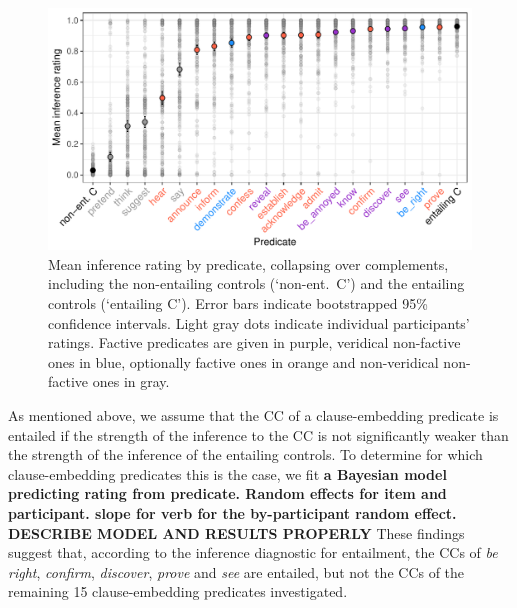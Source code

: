 \documentclass[11pt,fleqn]{article}
\newcommand{\6}{\mbox{$[\hspace*{-.6mm}[$}}
\newcommand{\9}{\mbox{$]\hspace*{-.6mm}]$}}
\begin{document}
\begin{figure}[h!]
\centering

\includegraphics[width=.7\paperwidth]{../results/4-veridicality3/graphs/means-inference-by-predicate-variability}

\caption{Mean inference rating by predicate, collapsing over complements, including the non-entailing controls (`non-ent.\ C') and the entailing controls (`entailing C'). Error bars indicate bootstrapped 95\% confidence intervals. Light gray dots indicate individual participants' ratings. Factive predicates are given in purple, veridical non-factive ones in blue, optionally factive ones in orange and non-veridical non-factive ones in gray.}
\label{f-veridicality-predicate2}
\end{figure}

As mentioned above, we assume that the CC of a clause-embedding predicate is entailed if the strength of the inference to the CC is not significantly weaker than the strength of the inference of the entailing controls. To determine for which clause-embedding predicates this is the case, we fit {\bf a Bayesian model predicting rating from predicate. Random effects for item and participant. slope for verb for the by-participant random effect. DESCRIBE MODEL AND RESULTS PROPERLY}  These findings suggest that, according to the inference diagnostic for entailment, the CCs of {\em be right}, {\em confirm}, {\em discover}, {\em prove} and {\em see} are entailed, but not the CCs of the remaining 15 clause-embedding predicates investigated.
\end{document}
